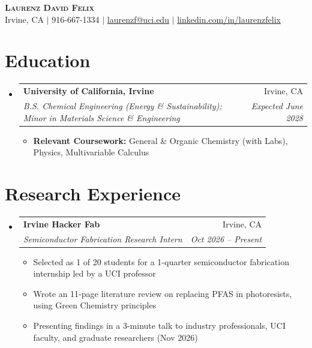 \documentclass[letterpaper,11pt]{article}
\makeatletter
\newcommand{\resumeItem}[1]{\item\small{{#1 \vspace{-2pt}}}}
\newcommand{\resumeSubheading}[4]{\vspace{-2pt}\item
  \begin{tabular*}{0.97\textwidth}[t]{l@{\extracolsep{\fill}}r}
    \textbf{#1} & #2 \\ \textit{\small#3} & \textit{\small #4} \\
  \end{tabular*}\vspace{-7pt}}
\newcommand{\resumeSubHeadingListStart}{\begin{itemize}[leftmargin=0.15in, label={}]}
\newcommand{\resumeSubHeadingListEnd}{\end{itemize}}
\newcommand{\resumeItemListStart}{\begin{itemize}}
\newcommand{\resumeItemListEnd}{\end{itemize}\vspace{-5pt}}
\makeatother
\begin{document}
\begin{center}
  \textbf{\Huge \scshape Laurenz David Felix} \\ \vspace{1pt}
  \small Irvine, CA $|$ 916-667-1334 $|$ \href{mailto:laurenzf@uci.edu}{laurenzf@uci.edu} $|$
  \href{https://www.linkedin.com/in/laurenzfelix/}{linkedin.com/in/laurenzfelix}
\end{center}

\section{Education}
\resumeSubHeadingListStart
  \resumeSubheading{University of California, Irvine}{Irvine, CA}
    {B.S. Chemical Engineering (Energy \& Sustainability); Minor in Materials Science \& Engineering}{Expected June 2028}
  \resumeItemListStart
    \resumeItem{\textbf{Relevant Coursework:} General \& Organic Chemistry (with Labs), Physics, Multivariable Calculus}
  \resumeItemListEnd
\resumeSubHeadingListEnd

\section{Research Experience}
\resumeSubHeadingListStart
  \resumeSubheading{Irvine Hacker Fab}{Irvine, CA}{Semiconductor Fabrication Research Intern}{Oct 2026 -- Present}
  \resumeItemListStart
    \resumeItem{Selected as 1 of 20 students for a 1-quarter semiconductor fabrication internship led by a UCI professor}
    \resumeItem{Wrote an 11-page literature review on replacing PFAS in photoresists, using Green Chemistry principles}
    \resumeItem{Presenting findings in a 3-minute talk to industry professionals, UCI faculty, and graduate researchers (Nov 2026)}
  \resumeItemListEnd
\resumeSubHeadingListEnd
\end{document}
